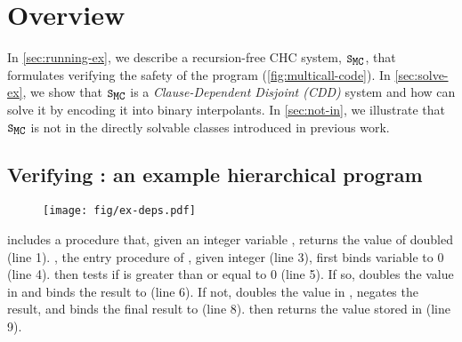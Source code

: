 \section{Overview}
\label{sec:overview}

In \autoref{sec:running-ex}, we describe a recursion-free CHC system,
$\mcchc$, that formulates verifying the safety of the program
 (\autoref{fig:multicall-code}).
%
In \autoref{sec:solve-ex}, we show that $\mcchc$ is a
\emph{Clause-Dependent Disjoint (CDD)} system and how \sys can solve it by 
encoding it into binary interpolants.
%
In \autoref{sec:not-in}, we illustrate that
$\mcchc$ is not in the directly solvable classes introduced in
previous work.
%


\subsection{Verifying : an example hierarchical program}
\label{sec:running-ex}

\begin{figure}[t]
  \centering
  \begin{floatrow}[2]
    {  }
    { \texttt{[image: fig/ex-deps.pdf]} }
  \end{floatrow}
\end{figure}
%
 includes a procedure  that, given an integer
variable , returns the value of  doubled (line 1).
%
, the entry procedure of , given integer 
(line 3), first binds variable  to $0$ (line 4).
%
 then tests if  is greater than or equal to $0$ (line
5).
%
If so,  doubles the value in  and binds the result to
 (line 6).
%
If not,  doubles the value in , negates the result, and
binds the final result to  (line 8).
%
 then returns the value stored in  (line 9).

